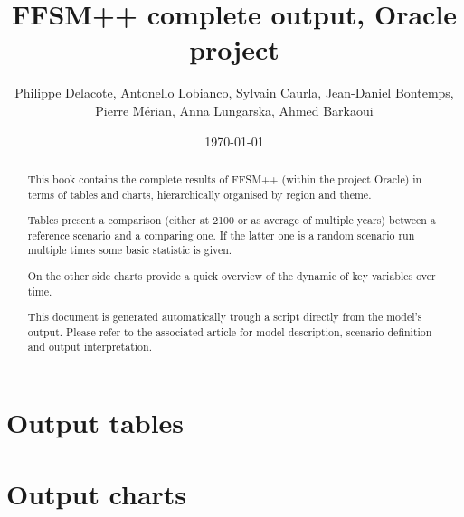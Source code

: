 \documentclass[a4paper,11pt]{paper}
\title{FFSM++ complete output, Oracle project}
\author{Philippe Delacote, Antonello Lobianco, Sylvain Caurla, Jean-Daniel Bontemps, Pierre Mérian, Anna Lungarska, Ahmed Barkaoui}
\date{\today}
\begin{document}
\maketitle

\begin{abstract}
This book contains the complete results of FFSM++ (within the project Oracle) in terms of tables and charts, hierarchically organised by region and theme.

Tables present a comparison (either at 2100 or as average of multiple years) between a reference scenario and a comparing one. If the latter one is a random scenario run multiple times some basic statistic is given.

On the other side charts provide a quick overview of the dynamic of key variables over time.

This document is generated automatically trough a script directly from the model's output. Please refer to the associated article for model description, scenario definition and output interpretation.

\end{abstract}

\thispagestyle{empty}
\newpage
\tableofcontents
\thispagestyle{empty}
\newpage
\part[Tables]{Output tables}

\clearpage
\newpage
\part[Charts]{Output charts}

\clearpage
\newpage
%

%
\end{document}
